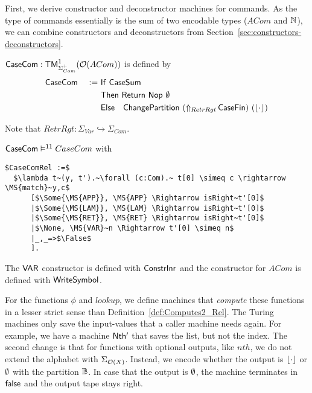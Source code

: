 First, we derive constructor and deconstructor machines for commands.  As the type of commands essentially is the sum of two encodable types ($ACom$
and $\Nat$), we can combine constructors and deconstructors from Section~\ref{sec:constructors-deconstructors}.
%
\begin{definition}[$\MS{CaseCom}$][CaseTok]
  $\MS{CaseCom} : \TM_{\Sigma^+_{Com}}^1(\Option(ACom))$ is defined by
  \begin{alignat*}{2}
    & \MS{CaseCom} &~:=~& \MS{If}~\MS{CaseSum} \\
    &               &    & \MS{Then}~   \Return{\Nop}{\None} \\
    &               &    & \MS{Else}~~~ \MS{ChangePartition}~(\LiftAlphabet{\MS{CaseFin}}{RetrRgt})~(\Some\cdot)
  \end{alignat*}
\end{definition}
Note that $RetrRgt : \Sigma_{Var} \hookrightarrow \Sigma_{Com}$.
\begin{lemma}
  \label{lem:CaseCom_Sem}
  $\MS{CaseCom} \RealiseIn{11} CaseCom$ with
\begin{lstlisting}[style=semicoqstyle]
$CaseComRel :=$
  $\lambda t~(y, t').~\forall (c:Com).~ t[0] \simeq c \rightarrow \MS{match}~y,c$
      [$\Some{\MS{APP}}, \MS{APP} \Rightarrow isRight~t'[0]$
      |$\Some{\MS{LAM}}, \MS{LAM} \Rightarrow isRight~t'[0]$
      |$\Some{\MS{RET}}, \MS{RET} \Rightarrow isRight~t'[0]$
      |$\None, \MS{VAR}~n \Rightarrow t'[0] \simeq n$
      |_,_=>$\False$
      ].
\end{lstlisting}
\end{lemma}
The $\MS{VAR}$ constructor is defined with $\MS{ConstrInr}$ and the constructor for $ACom$ is defined with $\MS{WriteSymbol}$.

For the functions $\phi$ and $lookup$, we define machines that \textit{compute} these functions in a lesser strict sense than
Definition~\ref{def:Computes2_Rel}.  The Turing machines only save the input-values that a caller machine needs again.  For example, we have a machine
$\MS{Nth'}$ that saves the list, but not the index.  The second change is that for functions with optional outputs, like $nth$, we do not extend the
alphabet with $\Sigma_{\Option(X)}$.  Instead, we encode whether the output is $\Some{\cdot}$ or $\None$ with the partition $\Bool$.  In case that the
output is $\None$, the machine terminates in $\false$ and the output tape stays right.

